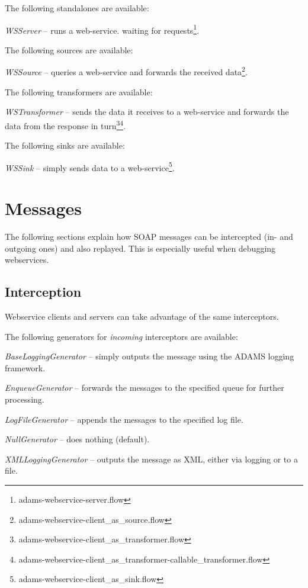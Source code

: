 \documentclass[a4paper]{book}
\begin{document}
The following standalones are available:
\begin{tight_itemize}
	\item \textit{WSServer} -- runs a web-service. waiting for 
	requests\footnote{adams-webservice-server.flow}.
\end{tight_itemize}
The following sources are available:
\begin{tight_itemize}
	\item \textit{WSSource} -- queries a web-service and forwards the received 
	data\footnote{adams-webservice-client\_as\_source.flow}.
\end{tight_itemize}
The following transformers are available:
\begin{tight_itemize}
	\item \textit{WSTransformer} -- sends the data it receives to a web-service
	and forwards the data from the response in 
	turn\footnote{adams-webservice-client\_as\_transformer.flow}\footnote{adams-webservice-client\_as\_transformer-callable\_transformer.flow}.
\end{tight_itemize}
The following sinks are available:
\begin{tight_itemize}
	\item \textit{WSSink} -- simply sends data to a web-service\footnote{adams-webservice-client\_as\_sink.flow}.
\end{tight_itemize}

\chapter{Messages}
The following sections explain how SOAP messages can be intercepted (in- and
outgoing ones) and also replayed. This is especially useful when debugging
webservices.

\section{Interception}
Webservice clients and servers can take advantage of the same interceptors.

\noindent The following generators for \textit{incoming} interceptors are available:
\begin{tight_itemize}
  \item \textit{BaseLoggingGenerator} -- simply outputs the message using the
  ADAMS logging framework.
  \item \textit{EnqueueGenerator} -- forwards the messages to the specified
  queue for further processing.
  \item \textit{LogFileGenerator} -- appends the messages to the specified log file.
  \item \textit{NullGenerator} -- does nothing (default).
  \item \textit{XMLLoggingGenerator} -- outputs the message as XML, either via
  logging or to a file.
\end{tight_itemize}
\end{document}
